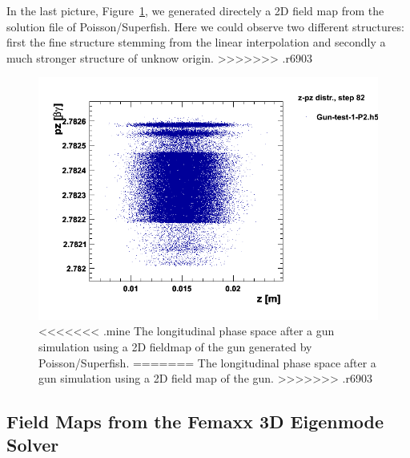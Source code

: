 In the last picture, Figure~\ref{figure_2ddynamic_step82}, we generated directely a 2D field map from the solution file of Poisson/Superfish. Here we could observe two different structures: first the fine structure stemming from the linear interpolation and secondly a much stronger structure of unknow origin.
>>>>>>> .r6903
\begin{figure}
  \begin{center}
  \includegraphics[origin=bl,height=80mm,angle=0]{./figures/Fieldmaps/2DDynamic_step82.png}
  \caption{\label{figure_2ddynamic_step82}
<<<<<<< .mine
    The longitudinal phase space after a gun simulation using a 2D fieldmap of the gun generated by Poisson/Superfish.
=======
    The longitudinal phase space after a gun simulation using a 2D field map of the gun.
>>>>>>> .r6903
  }
  \end{center}
%
\end{figure}


\subsection{Field Maps from the Femaxx 3D Eigenmode Solver}

